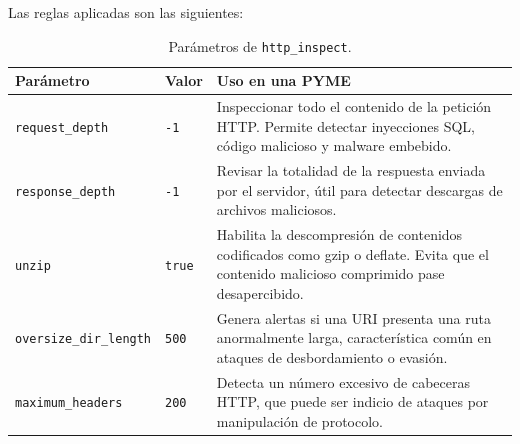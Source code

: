 \documentclass[12pt,a4paper]{report}
\begin{document}
Las reglas aplicadas son las siguientes:
\newline

\begin{table}[ht]
	\centering
	\begin{tabular}{l l p{7cm}}
		\hline
		\textbf{Parámetro} & \textbf{Valor} & \textbf{Uso en una PYME}\\
		\hline
		\texttt{request\_depth}       & \texttt{-1} & Inspeccionar todo el contenido de la petición HTTP. Permite detectar inyecciones SQL, código malicioso y malware embebido.\\
		\texttt{response\_depth}      & \texttt{-1} & Revisar la totalidad de la respuesta enviada por el servidor, útil para detectar descargas de archivos maliciosos.\\
		\texttt{unzip}                & \texttt{true} & Habilita la descompresión de contenidos codificados como gzip o deflate. Evita que el contenido malicioso comprimido pase desapercibido.\\
		\texttt{oversize\_dir\_length}& \texttt{500} & Genera alertas si una URI presenta una ruta anormalmente larga, característica común en ataques de desbordamiento o evasión.\\
		\texttt{maximum\_headers}     & \texttt{200} & Detecta un número excesivo de cabeceras HTTP, que puede ser indicio de ataques por manipulación de protocolo.\\
		\hline
	\end{tabular}
	\caption{Parámetros de \texttt{http\_inspect}.}
\end{table}
\end{document}
